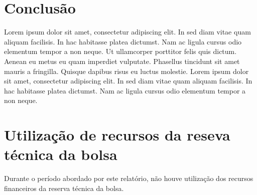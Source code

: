 \documentclass[11pt]{article}
\begin{document}
\section{Conclusão}
Lorem ipsum dolor sit amet, consectetur adipiscing elit. In sed diam vitae quam aliquam facilisis. In hac habitasse platea dictumst. Nam ac ligula cursus odio elementum tempor a non neque. Ut ullamcorper porttitor felis quis dictum. Aenean eu metus eu quam imperdiet vulputate. Phasellus tincidunt sit amet mauris a fringilla. Quisque dapibus risus eu luctus molestie. Lorem ipsum dolor sit amet, consectetur adipiscing elit. In sed diam vitae quam aliquam facilisis. In hac habitasse platea dictumst. Nam ac ligula cursus odio elementum tempor a non neque. 






\newpage

\section*{Utilização de recursos da reseva técnica da bolsa}

Durante o período abordado por este relatório, não houve utilização dos recursos financeiros da reserva técnica da bolsa.

\newpage

\printbibliography
\end{document}
